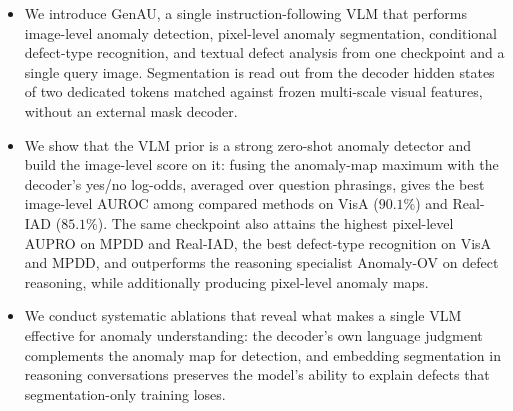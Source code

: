 \begin{itemize}
    \item We introduce GenAU, a single instruction-following VLM that performs image-level anomaly detection, pixel-level anomaly segmentation, conditional defect-type recognition, and textual defect analysis from one checkpoint and a single query image. Segmentation is read out from the decoder hidden states of two dedicated tokens matched against frozen multi-scale visual features, without an external mask decoder.

    \item We show that the VLM prior is a strong zero-shot anomaly detector and build the image-level score on it: fusing the anomaly-map maximum with the decoder's yes/no log-odds, averaged over question phrasings, gives the best image-level AUROC among compared methods on VisA ($90.1\%$) and Real-IAD ($85.1\%$). The same checkpoint also attains the highest pixel-level AUPRO on MPDD and Real-IAD, the best defect-type recognition on VisA and MPDD, and outperforms the reasoning specialist Anomaly-OV on defect reasoning, while additionally producing pixel-level anomaly maps.

    \item We conduct systematic ablations that reveal what makes a single VLM effective for anomaly understanding: the decoder's own language judgment complements the anomaly map for detection, and embedding segmentation in reasoning conversations preserves the model's ability to explain defects that segmentation-only training loses.
\end{itemize}

